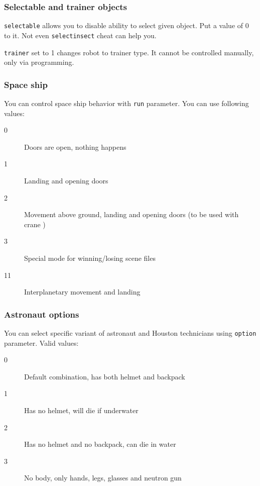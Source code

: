 \subsubsection{Selectable and trainer objects}

\texttt{selectable} allows you to disable ability to select given object. Put a value of 0 to it. Not even \texttt{selectinsect} cheat can help you.

\texttt{trainer} set to 1 changes robot to trainer type. It cannot be controlled manually, only via programming.



\subsubsection{Space ship}

You can control space ship behavior with \texttt{run} parameter. You can use following values:

\begin{description}
    \item[0] Doors are open, nothing happens
    \item[1] Landing and opening doors
    \item[2] Movement above ground, landing and opening doors (to be used with crane )
    \item[3] Special mode for winning/losing scene files
    \item[11] Interplanetary movement and landing 
\end{description}


\subsubsection{Astronaut options}

You can select specific variant of astronaut and Houston technicians using \texttt{option} parameter. Valid values:

\begin{description}
    \item[0] Default combination, has both helmet and backpack
    \item[1] Has no helmet, will die if underwater
    \item[2] Has no helmet and no backpack, can die in water
    \item[3] No body, only hands, legs, glasses and neutron gun
\end{description}


